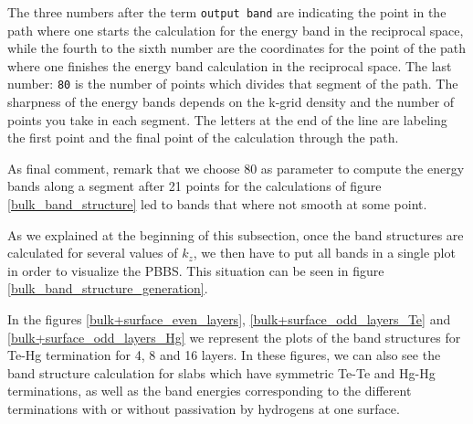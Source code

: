 	The three numbers after the term \texttt{output band} are indicating the point in the path where one starts the calculation for the energy band in the reciprocal space, while the fourth to the sixth number are the coordinates for the point of the path where one finishes the energy band calculation in the reciprocal space.
	The last number: \texttt{80} is the number of points which divides that segment of the path. The sharpness of the energy bands depends on the k-grid density and the number of points you take in each segment.	
	The letters at the end of the line are labeling the first point and the final point of the calculation through the path.
	
	As final comment, remark that we choose 80 as parameter to compute the energy bands along a segment after 21 points for the calculations of figure \ref{bulk_band_structure} led to bands that where not smooth at some point.

	As we explained at the beginning of this subsection, once the band structures are calculated for several values of $k_z$, we then have to put all bands in a single plot in order to visualize the PBBS. This situation can be seen in figure \ref{bulk_band_structure_generation}.

	In the figures \ref{bulk+surface_even_layers}, \ref{bulk+surface_odd_layers_Te} and \ref{bulk+surface_odd_layers_Hg} we represent the plots of the band structures for Te-Hg termination for 4, 8 and 16 layers. 
	In these figures, we can also see the band structure calculation for slabs which have symmetric Te-Te and Hg-Hg terminations, as well as the band energies corresponding to the different terminations with or without passivation by hydrogens at one surface.
	
